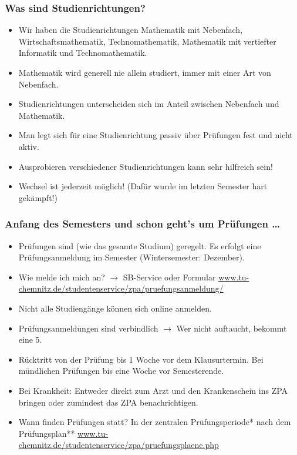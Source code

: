 \begin{frame}
\frametitle{Was sind Studienrichtungen?}
\begin{itemize}
	\item Wir haben die Studienrichtungen Mathematik mit Nebenfach, Wirtschaftsmathematik, Technomathematik, Mathematik mit vertiefter Informatik und Technomathematik.
	\item Mathematik wird generell nie allein studiert, immer mit einer Art von Nebenfach.
	\item Studienrichtungen unterscheiden sich im Anteil zwischen Nebenfach und Mathematik.
	\item Man legt sich für eine Studienrichtung passiv über Prüfungen fest und nicht aktiv.
	\item Ausprobieren verschiedener Studienrichtungen kann sehr hilfreich sein!
	\item Wechsel ist jederzeit möglich! (Dafür wurde im letzten Semester hart gekämpft!)
\end{itemize}
\end{frame}

\begin{frame}
\frametitle{Anfang des Semesters und schon geht's um Prüfungen \dots}
\begin{itemize}
	\item Prüfungen sind (wie das gesamte Studium) geregelt. Es erfolgt eine Prüfungsanmeldung im Semester (Wintersemester: Dezember).
	\item Wie melde ich mich an? $\rightarrow$ SB-Service oder Formular \href{https://www.tu-chemnitz.de/studentenservice/zpa/pruefungsanmeldung/index.php}{www.tu-chemnitz.de/studentenservice/zpa/pruefungsanmeldung/}
	\item Nicht alle Studiengänge können sich online anmelden. 
	\item Prüfungsanmeldungen sind verbindlich $\rightarrow$ Wer nicht auftaucht, bekommt eine 5. 
	\item Rücktritt von der Prüfung bis 1 Woche vor dem Klausurtermin. Bei mündlichen Prüfungen bis eine Woche vor Semesterende. 
	\item Bei Krankheit: Entweder direkt zum Arzt und den Krankenschein ins ZPA bringen oder zumindest das ZPA benachrichtigen.
	\item Wann finden Prüfungen statt? In der zentralen Prüfungsperiode* nach dem Prüfungsplan** \href{https://www.tu-chemnitz.de/studentenservice/zpa/pruefungsplaene.php}{www.tu-chemnitz.de/studentenservice/zpa/pruefungsplaene.php}
\end{itemize}
\end{frame}

